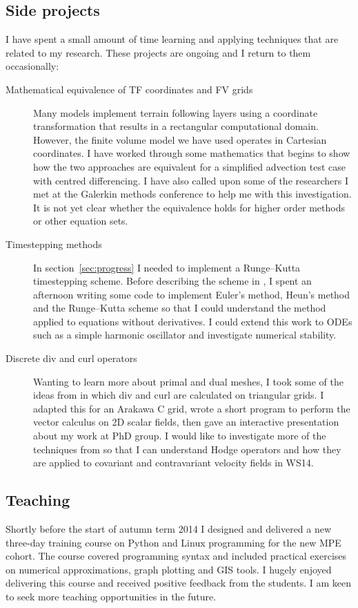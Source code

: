 \documentclass[a4paper]{article}
\begin{document}
\subsection{Side projects}
I have spent a small amount of time learning and applying techniques that are related to my research.  These projects are ongoing and I return to them occasionally:
\begin{description}
	\item[Mathematical equivalence of TF coordinates and FV grids]{Many models implement terrain following layers using a coordinate transformation that results in a rectangular computational domain.  However, the finite volume model we have used operates in Cartesian coordinates.  I have worked through some mathematics that begins to show how the two approaches are equivalent for a simplified advection test case with centred differencing.  I have also called upon some of the researchers I met at the Galerkin methods conference to help me with this investigation.  It is not yet clear whether the equivalence holds for higher order methods or other equation sets.}
	\item[Timestepping methods]{In section~\ref{sec:progress} I needed to implement a Runge--Kutta timestepping scheme.  Before describing the scheme in \citet{shaw-weller2015}, I spent an afternoon writing some code to implement Euler's method, Heun's method and the Runge--Kutta scheme so that I could understand the method applied to equations without derivatives.  I could extend this work to ODEs such as a simple harmonic oscillator and investigate numerical stability.}
	\item[Discrete div and curl operators]{Wanting to learn more about primal and dual meshes, I took some of the ideas from \citet{nicolaides1992} in which div and curl are calculated on triangular grids.  I adapted this for an Arakawa C grid, wrote a short program to perform the vector calculus on 2D scalar fields, then gave an interactive presentation about my work at PhD group.  I would like to investigate more of the techniques from \citet{nicolaides1992} so that I can understand Hodge operators and how they are applied to covariant and contravariant velocity fields in WS14.}
\end{description}

\subsection{Teaching}
Shortly before the start of autumn term 2014 I designed and delivered a new three-day training course on Python and Linux programming for the new MPE cohort.  The course covered programming syntax and included practical exercises on numerical approximations, graph plotting and GIS tools.  I hugely enjoyed delivering this course and received positive feedback from the students.  I am keen to seek more teaching opportunities in the future.
\end{document}

